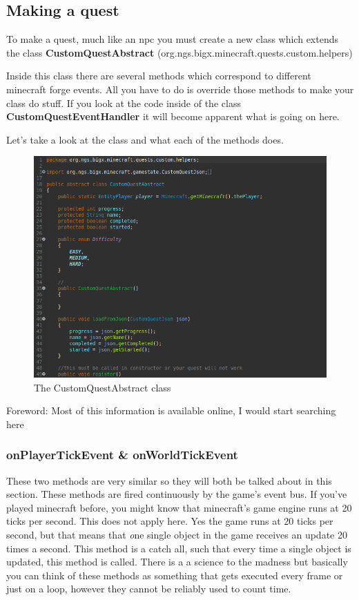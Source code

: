 \documentclass[12pt]{article}
\begin{document}
\subsection{Making a quest}

To make a quest, much like an npc you must create a new class which extends the class {\bfseries CustomQuestAbstract} (org.ngs.bigx.minecraft.quests.custom.helpers)

Inside this class there are several methods which correspond to different minecraft forge events. All you have to do is override those methods to make your class do stuff. If you look at the code inside of the class {\bfseries CustomQuestEventHandler} it will become apparent what is going on here.

Let's take a look at the class and what each of the methods does.

\begin{figure}[H]
	\caption{The CustomQuestAbstract class}
	\includegraphics[scale=0.3]{images/quests/CustomQuestAbstract.png}
	\centering
\end{figure}

Foreword: Most of this information is available online, I would start searching here

\subsubsection{onPlayerTickEvent \& onWorldTickEvent}

These two methods are very similar so they will both be talked about in this section. These methods are fired continuously by the game's event bus. If you've played minecraft before, you might know that minecraft's game engine runs at 20 ticks per second. This does not apply here. Yes the game runs at 20 ticks per second, but that means that {\emph one single object} in the game receives an update 20 times a second. This method is a catch all, such that every time a single object is updated, this method is called. There is a a science to the madness but basically you can think of these methods as something that gets executed every frame or just on a loop, however they cannot be reliably used to count time. 
\end{document}
